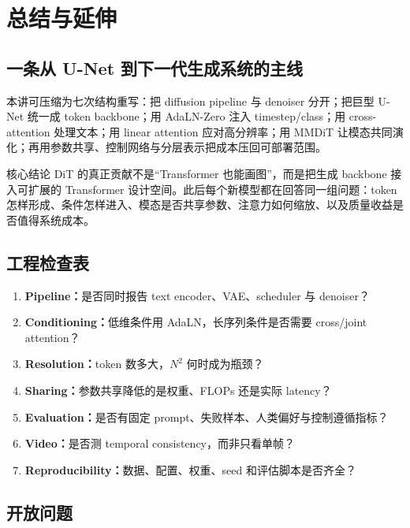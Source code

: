 \section{总结与延伸}

\subsection{一条从 U-Net 到下一代生成系统的主线}

本讲可压缩为七次结构重写：把 diffusion pipeline 与 denoiser 分开；把巨型 U-Net 统一成 token backbone；用 AdaLN-Zero 注入 timestep/class；用 cross-attention 处理文本；用 linear attention 应对高分辨率；用 MMDiT 让模态共同演化；再用参数共享、控制网络与分层表示把成本压回可部署范围。

\begin{importantbox}{核心结论}
DiT 的真正贡献不是“Transformer 也能画图”，而是把生成 backbone 接入可扩展的 Transformer 设计空间。此后每个新模型都在回答同一组问题：token 怎样形成、条件怎样进入、模态是否共享参数、注意力如何缩放、以及质量收益是否值得系统成本。
\end{importantbox}

\subsection{工程检查表}

\begin{enumerate}
  \item \textbf{Pipeline：}是否同时报告 text encoder、VAE、scheduler 与 denoiser？
  \item \textbf{Conditioning：}低维条件用 AdaLN，长序列条件是否需要 cross/joint attention？
  \item \textbf{Resolution：}token 数多大，$N^2$ 何时成为瓶颈？
  \item \textbf{Sharing：}参数共享降低的是权重、FLOPs 还是实际 latency？
  \item \textbf{Evaluation：}是否有固定 prompt、失败样本、人类偏好与控制遵循指标？
  \item \textbf{Video：}是否测 temporal consistency，而非只看单帧？
  \item \textbf{Reproducibility：}数据、配置、权重、seed 和评估脚本是否齐全？
\end{enumerate}

\subsection{开放问题}

